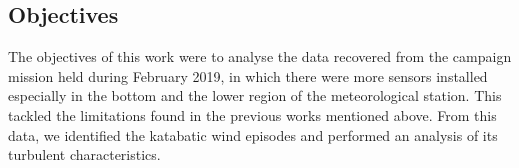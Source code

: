 \subsection{Objectives}

The objectives of this work were to analyse the data recovered from the campaign mission held during February 2019, in which there were more sensors installed especially in the bottom and the lower region of the meteorological station. This tackled the limitations found in the previous works mentioned above. From this data, we identified the katabatic wind episodes and performed an analysis of its turbulent characteristics.
